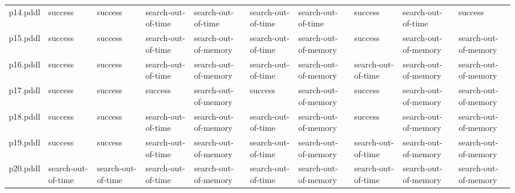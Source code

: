 \documentclass{article}
\begin{document}
\begin{tabular}{@{}lrrrrrrrrr@{}}
p14.pddl & \multicolumn{1}{|l|}{success} & \multicolumn{1}{|l|}{success} & \multicolumn{1}{|l|}{search-out-of-time} & \multicolumn{1}{|l|}{search-out-of-time} & \multicolumn{1}{|l|}{search-out-of-time} & \multicolumn{1}{|l|}{search-out-of-time} & \multicolumn{1}{|l|}{success} & \multicolumn{1}{|l|}{search-out-of-time} & \multicolumn{1}{|l|}{success} \\
p15.pddl & \multicolumn{1}{|l|}{success} & \multicolumn{1}{|l|}{success} & \multicolumn{1}{|l|}{search-out-of-time} & \multicolumn{1}{|l|}{search-out-of-memory} & \multicolumn{1}{|l|}{search-out-of-time} & \multicolumn{1}{|l|}{search-out-of-memory} & \multicolumn{1}{|l|}{success} & \multicolumn{1}{|l|}{search-out-of-memory} & \multicolumn{1}{|l|}{search-out-of-memory} \\
p16.pddl & \multicolumn{1}{|l|}{success} & \multicolumn{1}{|l|}{success} & \multicolumn{1}{|l|}{search-out-of-time} & \multicolumn{1}{|l|}{search-out-of-memory} & \multicolumn{1}{|l|}{search-out-of-time} & \multicolumn{1}{|l|}{search-out-of-memory} & \multicolumn{1}{|l|}{search-out-of-time} & \multicolumn{1}{|l|}{search-out-of-memory} & \multicolumn{1}{|l|}{search-out-of-memory} \\
p17.pddl & \multicolumn{1}{|l|}{success} & \multicolumn{1}{|l|}{success} & \multicolumn{1}{|l|}{success} & \multicolumn{1}{|l|}{search-out-of-memory} & \multicolumn{1}{|l|}{success} & \multicolumn{1}{|l|}{search-out-of-memory} & \multicolumn{1}{|l|}{success} & \multicolumn{1}{|l|}{search-out-of-memory} & \multicolumn{1}{|l|}{search-out-of-memory} \\
p18.pddl & \multicolumn{1}{|l|}{success} & \multicolumn{1}{|l|}{success} & \multicolumn{1}{|l|}{search-out-of-time} & \multicolumn{1}{|l|}{search-out-of-memory} & \multicolumn{1}{|l|}{search-out-of-time} & \multicolumn{1}{|l|}{search-out-of-memory} & \multicolumn{1}{|l|}{success} & \multicolumn{1}{|l|}{search-out-of-memory} & \multicolumn{1}{|l|}{search-out-of-memory} \\
p19.pddl & \multicolumn{1}{|l|}{success} & \multicolumn{1}{|l|}{success} & \multicolumn{1}{|l|}{search-out-of-time} & \multicolumn{1}{|l|}{search-out-of-memory} & \multicolumn{1}{|l|}{search-out-of-time} & \multicolumn{1}{|l|}{search-out-of-memory} & \multicolumn{1}{|l|}{search-out-of-time} & \multicolumn{1}{|l|}{search-out-of-memory} & \multicolumn{1}{|l|}{search-out-of-memory} \\
p20.pddl & \multicolumn{1}{|l|}{search-out-of-time} & \multicolumn{1}{|l|}{search-out-of-time} & \multicolumn{1}{|l|}{search-out-of-time} & \multicolumn{1}{|l|}{search-out-of-memory} & \multicolumn{1}{|l|}{search-out-of-time} & \multicolumn{1}{|l|}{search-out-of-memory} & \multicolumn{1}{|l|}{search-out-of-time} & \multicolumn{1}{|l|}{search-out-of-memory} & \multicolumn{1}{|l|}{search-out-of-memory} \\
\end{tabular}
\end{document}
